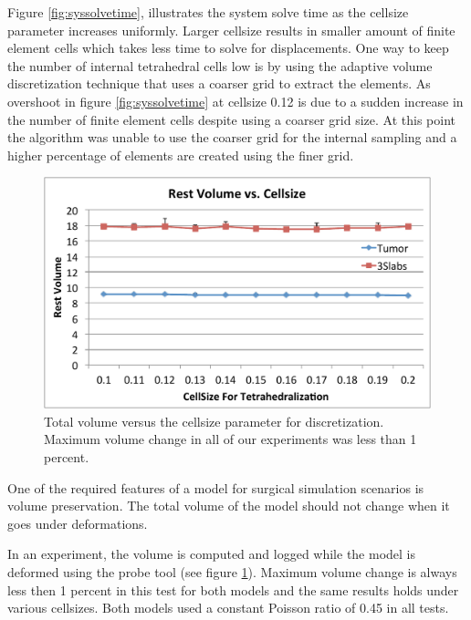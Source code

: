 Figure \ref{fig:syssolvetime}, illustrates the system solve time as the cellsize parameter increases 
uniformly. Larger cellsize results in smaller amount of finite element cells which takes less time to solve
for displacements. One way to keep the number of internal tetrahedral cells low 
is by using the adaptive volume discretization technique that uses a coarser grid to extract the elements. 
As overshoot in figure \ref{fig:syssolvetime} at cellsize 0.12 is due to a 
sudden increase in the number of finite element cells despite using a coarser 
grid size. At this point the algorithm was unable to use the coarser grid for 
the internal sampling and a higher percentage of elements are created using the finer grid. 

\begin{figure}[H]
  \centering
  \includegraphics[width=0.8\linewidth]{figures/deformable/volumevscellsize.pdf}
 
  \caption{\label{fig:volumevscellsize}
  {Total volume versus the cellsize parameter for discretization. 
  Maximum volume change in all of our experiments was less than 1 percent.}
}
\end{figure}

One of the required features of a model for surgical simulation scenarios is 
volume preservation. The total volume of the model should not change when it goes under deformations. 

In an experiment, the volume is computed and logged while the model is deformed using the probe tool 
(see figure \ref{fig:volumevscellsize}). Maximum volume change is always less then 1 percent in this test 
for both models and the same results holds under various cellsizes. Both models 
used a constant Poisson ratio of 0.45 in all tests. 















